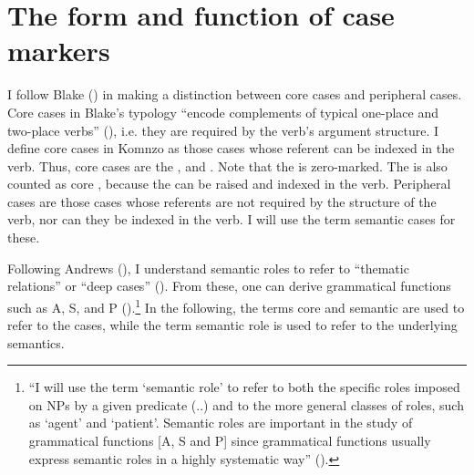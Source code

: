 \section{The form and function of case markers}\label{formfunccase}
\largerpage
I follow Blake (\citeyear{Blake:case}) in making a distinction between core cases and peripheral cases. Core cases in Blake's typology ``encode complements of typical one-place and two-place  verbs'' (\citeyear[32]{Blake:case}), i.e. they are required by the verb's argument structure. I define core cases in Komnzo as those cases whose referent can be indexed in the verb. Thus, core cases are the ,  and  . Note that the  is zero-marked. The  is also counted as core , because the  can be raised and indexed in the verb. Peripheral cases are those cases whose referents are not required by the structure of the verb, nor can they be indexed in the verb. I will use the term semantic cases for these.

Following Andrews (\citeyear{Andrews:2007nounphrase}), I understand semantic roles to refer to ``thematic relations'' or ``deep cases'' (\citealt{Fillmore:1968case}). From these, one can derive grammatical functions such as A, S, and P (\citealt{Dixon:1972dyirbal}).\footnote{``I will use the term ‘semantic role’ to refer to both the specific roles imposed on NPs by a given predicate (..) and to the more general classes of roles, such as ‘agent’ and ‘patient’. Semantic roles are important in the study of grammatical functions [A, S and P] since grammatical functions usually express semantic roles in a highly systematic way'' (\citealt[136]{Andrews:2007nounphrase}).} In the following, the terms core  and semantic  are used to refer to the cases, while the term semantic role is used to refer to the underlying semantics.

